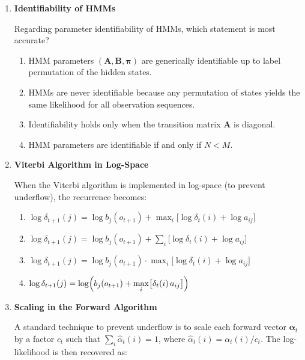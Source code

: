\documentclass[12pt]{article}
\begin{document}
\begin{enumerate}[label=\textbf{Q\arabic*.}, leftmargin=*, itemsep=2em]
\item \textbf{Identifiability of HMMs}

Regarding parameter identifiability of HMMs, which statement is most accurate?

\begin{enumerate}[label=\Alph*.]
    \item HMM parameters $(\mathbf{A}, \mathbf{B}, \boldsymbol{\pi})$ are generically
          identifiable up to label permutation of the hidden states.
    \item HMMs are never identifiable because any permutation of states yields
          the same likelihood for all observation sequences.
    \item Identifiability holds only when the transition matrix $\mathbf{A}$ is diagonal.
    \item HMM parameters are identifiable if and only if $N < M$.
\end{enumerate}

\item \textbf{Viterbi Algorithm in Log-Space}

When the Viterbi algorithm is implemented in log-space (to prevent underflow),
the recurrence becomes:

\begin{enumerate}[label=\Alph*.]
    \item $\displaystyle
          \log\delta_{t+1}(j)
          = \log b_j(o_{t+1})
            + \max_{i}\bigl[\log\delta_t(i) + \log a_{ij}\bigr]$
    \item $\displaystyle
          \log\delta_{t+1}(j)
          = \log b_j(o_{t+1})
            + \sum_{i}\bigl[\log\delta_t(i) + \log a_{ij}\bigr]$
    \item $\displaystyle
          \log\delta_{t+1}(j)
          = \log b_j(o_{t+1})
            \cdot \max_{i}\bigl[\log\delta_t(i) + \log a_{ij}\bigr]$
    \item $\displaystyle
          \log\delta_{t+1}(j)
          = \log\Bigl(b_j(o_{t+1}) + \max_{i}\bigl[\delta_t(i)\, a_{ij}\bigr]\Bigr)$
\end{enumerate}

\item \textbf{Scaling in the Forward Algorithm}

A standard technique to prevent underflow is to scale each forward vector
$\boldsymbol{\alpha}_t$ by a factor $c_t$ such that $\sum_i \hat{\alpha}_t(i) = 1$,
where $\hat{\alpha}_t(i) = \alpha_t(i) / c_t$. The log-likelihood is then
recovered as:


\end{enumerate}
\end{document}
